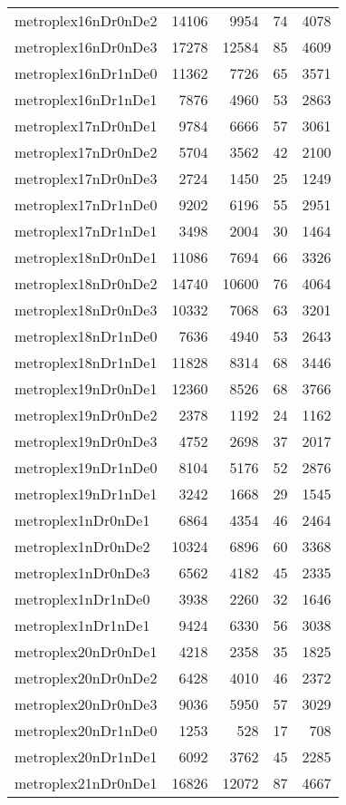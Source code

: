 \begin{longtable}{lrrrr}
metroplex16nDr0nDe2 & 14106 & 9954 & 74 & 4078 \\
metroplex16nDr0nDe3 & 17278 & 12584 & 85 & 4609 \\
metroplex16nDr1nDe0 & 11362 & 7726 & 65 & 3571 \\
metroplex16nDr1nDe1 & 7876 & 4960 & 53 & 2863 \\
metroplex17nDr0nDe1 & 9784 & 6666 & 57 & 3061 \\
metroplex17nDr0nDe2 & 5704 & 3562 & 42 & 2100 \\
metroplex17nDr0nDe3 & 2724 & 1450 & 25 & 1249 \\
metroplex17nDr1nDe0 & 9202 & 6196 & 55 & 2951 \\
metroplex17nDr1nDe1 & 3498 & 2004 & 30 & 1464 \\
metroplex18nDr0nDe1 & 11086 & 7694 & 66 & 3326 \\
metroplex18nDr0nDe2 & 14740 & 10600 & 76 & 4064 \\
metroplex18nDr0nDe3 & 10332 & 7068 & 63 & 3201 \\
metroplex18nDr1nDe0 & 7636 & 4940 & 53 & 2643 \\
metroplex18nDr1nDe1 & 11828 & 8314 & 68 & 3446 \\
metroplex19nDr0nDe1 & 12360 & 8526 & 68 & 3766 \\
metroplex19nDr0nDe2 & 2378 & 1192 & 24 & 1162 \\
metroplex19nDr0nDe3 & 4752 & 2698 & 37 & 2017 \\
metroplex19nDr1nDe0 & 8104 & 5176 & 52 & 2876 \\
metroplex19nDr1nDe1 & 3242 & 1668 & 29 & 1545 \\
metroplex1nDr0nDe1 & 6864 & 4354 & 46 & 2464 \\
metroplex1nDr0nDe2 & 10324 & 6896 & 60 & 3368 \\
metroplex1nDr0nDe3 & 6562 & 4182 & 45 & 2335 \\
metroplex1nDr1nDe0 & 3938 & 2260 & 32 & 1646 \\
metroplex1nDr1nDe1 & 9424 & 6330 & 56 & 3038 \\
metroplex20nDr0nDe1 & 4218 & 2358 & 35 & 1825 \\
metroplex20nDr0nDe2 & 6428 & 4010 & 46 & 2372 \\
metroplex20nDr0nDe3 & 9036 & 5950 & 57 & 3029 \\
metroplex20nDr1nDe0 & 1253 & 528 & 17 & 708 \\
metroplex20nDr1nDe1 & 6092 & 3762 & 45 & 2285 \\
metroplex21nDr0nDe1 & 16826 & 12072 & 87 & 4667 \\

\end{longtable}
